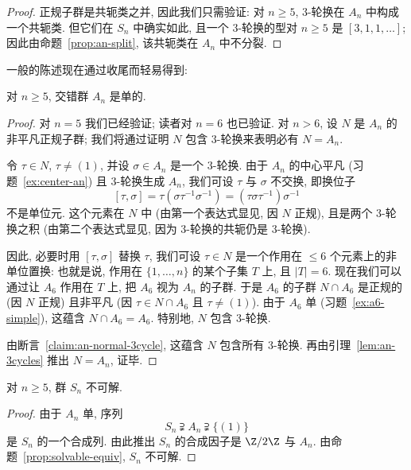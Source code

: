 \begin{proof}
正规子群是共轭类之并, 因此我们只需验证: 对 $n \geq 5$, $3$-轮换在 $A_n$ 中构成一个共轭类. 但它们在 $S_n$ 中确实如此, 且一个 $3$-轮换的型对 $n \geq 5$ 是 $[3,1,1,\dots]$; 因此由命题~\ref{prop:an-split}, 该共轭类在 $A_n$ 中不分裂.
\end{proof}

一般的陈述现在通过收尾而轻易得到:

\begin{theorem}
\label{thm:an-simple}
对 $n \geq 5$, 交错群 $A_n$ 是单的.
\end{theorem}

\begin{proof}
对 $n = 5$ 我们已经验证; 读者对 $n = 6$ 也已验证. 对 $n > 6$, 设 $N$ 是 $A_n$ 的非平凡正规子群; 我们将通过证明 $N$ 包含 $3$-轮换来表明必有 $N = A_n$.

令 $\tau \in N$, $\tau \neq (1)$, 并设 $\sigma \in A_n$ 是一个 $3$-轮换. 由于 $A_n$ 的中心平凡 (习题~\ref{ex:center-an}) 且 $3$-轮换生成 $A_n$, 我们可设 $\tau$ 与 $\sigma$ 不交换, 即换位子
\[
[\tau,\sigma] = \tau(\sigma\tau^{-1}\sigma^{-1}) = (\tau\sigma\tau^{-1})\sigma^{-1}
\]
不是单位元. 这个元素在 $N$ 中 (由第一个表达式显见, 因 $N$ 正规), 且是两个 $3$-轮换之积 (由第二个表达式显见, 因为 $3$-轮换的共轭仍是 $3$-轮换).

因此, 必要时用 $[\tau,\sigma]$ 替换 $\tau$, 我们可设 $\tau \in N$ 是一个作用在 $\leq 6$ 个元素上的非单位置换: 也就是说, 作用在 $\{1,\dots,n\}$ 的某个子集 $T$ 上, 且 $|T| = 6$. 现在我们可以通过让 $A_6$ 作用在 $T$ 上, 把 $A_6$ 视为 $A_n$ 的子群. 于是 $A_6$ 的子群 $N \cap A_6$ 是正规的 (因 $N$ 正规) 且非平凡 (因 $\tau \in N \cap A_6$ 且 $\tau \neq (1)$). 由于 $A_6$ 单 (习题~\ref{ex:a6-simple}), 这蕴含 $N \cap A_6 = A_6$. 特别地, $N$ 包含 $3$-轮换.

由断言~\ref{claim:an-normal-3cycle}, 这蕴含 $N$ 包含所有 $3$-轮换. 再由引理~\ref{lem:an-3cycles} 推出 $N = A_n$, 证毕.
\end{proof}

\begin{corollary}
\label{cor:sn-not-solvable}
对 $n \geq 5$, 群 $S_n$ 不可解.
\end{corollary}

\begin{proof}
由于 $A_n$ 单, 序列
\[
S_n \supsetneqq A_n \supsetneqq \{(1)\}
\]
是 $S_n$ 的一个合成列. 由此推出 $S_n$ 的合成因子是 $\Z/2\Z$ 与 $A_n$. 由命题~\ref{prop:solvable-equiv}, $S_n$ 不可解.
\end{proof}

